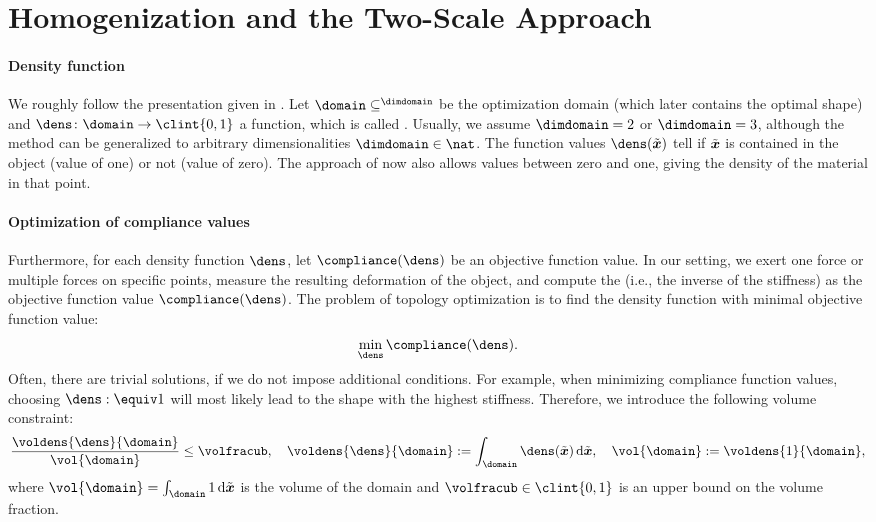 \section{Homogenization and the Two-Scale Approach}
\label{sec:61homogenization}

\paragraph{Density function}

We roughly follow the presentation given in
.
Let $\domain \subset \real^{\dimdomain}$ be the optimization domain
(which later contains the optimal shape) and
$\dens\colon \domain \to \clint{0, 1}$ a function,
which is called .
Usually, we assume $\dimdomain = 2$ or $\dimdomain = 3$,
although the method can be generalized to
arbitrary dimensionalities $\dimdomain \in \nat$.
The function values $\dens(\tilde{\*x})$ tell if $\tilde{{\boldsymbol{x}}}$
is contained in the object (value of one) or not (value of zero).
The approach of  now also allows values between
zero and one, giving the density of the material in that point.

\paragraph{Optimization of compliance values}

Furthermore, for each density function $\dens$,
let $\compliance(\dens)$ be an objective function value.
In our setting,
we exert one force or multiple forces on specific points,
measure the resulting deformation of the object, and
compute the  (i.e., the inverse of the stiffness) as
the objective function value $\compliance(\dens)$.
The problem of topology optimization is to find the density function
with minimal objective function value:
\begin{equation}
  \label{eq:topoOptProblemContinuous}
  \min_{\dens} \compliance(\dens).
\end{equation}
Often, there are trivial solutions, if we do not impose additional conditions.
For example, when minimizing compliance function values,
choosing $\dens :\equiv 1$ will most likely lead to the shape with the
highest stiffness.
Therefore, we introduce the following volume constraint:
\begin{equation}
  \frac{\voldens{\dens}{\domain}}{\vol{\domain}} \le \volfracub,\quad
  \voldens{\dens}{\domain}
  := \int_{\domain} \dens(\tilde{\*x}) \diff\tilde{\*x},\quad
  \vol{\domain}
  := \voldens{1}{\domain},
\end{equation}
where $\vol{\domain} = \int_{\domain} 1 \diff\tilde{\*x}$
is the volume of the domain and
$\volfracub \in \clint{0, 1}$ is an upper bound on the volume fraction.

